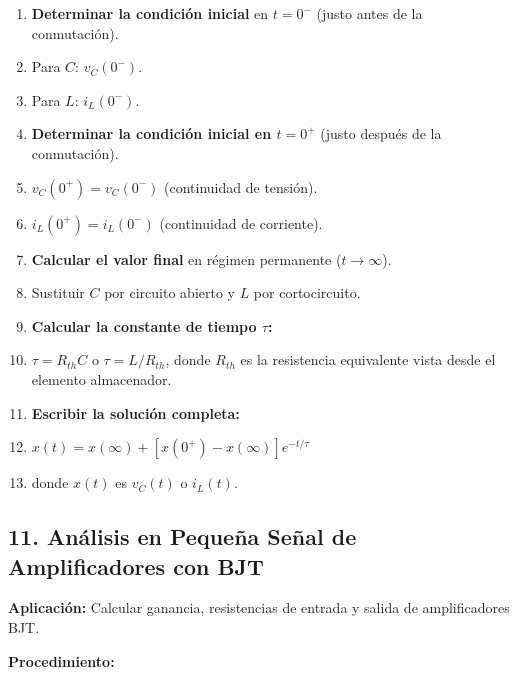 \documentclass[11pt,a4paper]{article}
\begin{document}
\begin{enumerate}[leftmargin=*,topsep=2pt,itemsep=1pt]
  \item \textbf{Determinar la condición inicial} en $t=0^-$ (justo antes de la conmutación).
  \item Para $C$: $v_C(0^-)$.
  \item Para $L$: $i_L(0^-)$.
  \item \textbf{Determinar la condición inicial en $t=0^+$} (justo después de la conmutación).
  \item $v_C(0^+) = v_C(0^-)$ (continuidad de tensión).
  \item $i_L(0^+) = i_L(0^-)$ (continuidad de corriente).
  \item \textbf{Calcular el valor final} en régimen permanente ($t \to \infty$).
  \item Sustituir $C$ por circuito abierto y $L$ por cortocircuito.
  \item \textbf{Calcular la constante de tiempo $\tau$:}
  \item $\tau = R_{th} C$ o $\tau = L / R_{th}$, donde $R_{th}$ es la resistencia equivalente vista desde el elemento almacenador.
  \item \textbf{Escribir la solución completa:}
  \item $x(t) = x(\infty) + [x(0^+) - x(\infty)] e^{-t/\tau}$
  \item donde $x(t)$ es $v_C(t)$ o $i_L(t)$.
\end{enumerate}


\subsection*{11. Análisis en Pequeña Señal de Amplificadores con BJT}


\textbf{Aplicación:} Calcular ganancia, resistencias de entrada y salida de amplificadores BJT.


\textbf{Procedimiento:}
\end{document}
